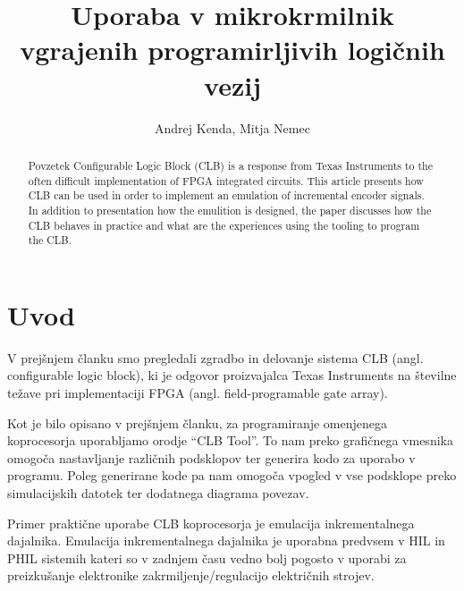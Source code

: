 \documentclass[a4paper]{article}
\begin{document}
\begin{sloppypar}
\title{Uporaba v mikrokrmilnik vgrajenih programirljivih logičnih vezij}

\author{Andrej Kenda, Mitja Nemec}



\maketitle



\begin{abstract}{Povzetek}
Configurable Logic Block (CLB) is a response from Texas Instruments to the often difficult implementation of FPGA integrated circuits. This article presents how CLB can be used in order to implement an emulation of incremental encoder signals. In addition to presentation how the emulition is designed, the paper discusses how the CLB behaves in practice and what are the experiences using the tooling to program the CLB.

\end{abstract}


\section{Uvod}
V prejšnjem članku smo pregledali zgradbo in delovanje sistema CLB (angl.
configurable logic block), ki je odgovor proizvajalca Texas Instruments na
številne težave pri implementaciji FPGA (angl. field-programable gate array). 

Kot je bilo opisano v prejšnjem članku, za programiranje omenjenega
koprocesorja uporabljamo orodje ``CLB Tool''. To nam preko grafičnega vmesnika
omogoča nastavljanje različnih podsklopov ter generira kodo za uporabo v
programu. Poleg generirane kode pa nam omogoča vpogled v vse podsklope preko
simulacijskih datotek ter dodatnega diagrama povezav.

Primer praktične uporabe CLB koprocesorja je emulacija inkrementalnega
dajalnika. Emulacija inkrementalnega dajalnika je uporabna predvsem v HIL in PHIL sistemih 
kateri so v zadnjem času vedno bolj pogosto v uporabi za preizkušanje elektronike zakrmiljenje/regulacijo električnih strojev.


\end{sloppypar}
\end{document}
